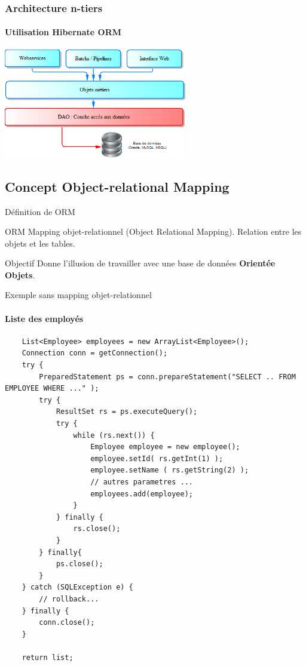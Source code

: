 \documentclass[compact]{beamer}%
\begin{document}
	\begin{frame}
	\frametitle{Architecture n-tiers}
	\framesubtitle{Utilisation Hibernate ORM}
	
	\begin{center}	
	\includegraphics[width=8cm]{images/arch_n_tiers_hibernate.png}
	\end{center}
\end{frame}
	
	
\subsection{Concept Object-relational Mapping}	
		
\begin{frame}{Définition de ORM}
	
	\begin{block}{ORM}
	Mapping objet-relationnel (Object Relational Mapping). Relation entre les objets et les tables.
	\end{block}

	\pause
	\begin{block}{Objectif}	
	Donne l'illusion de travailler avec une base de données \textbf{Orientée Objets}.
	\end{block}
	
\end{frame}
		
\begin{frame}[containsverbatim]{Exemple sans mapping objet-relationnel}
	\framesubtitle{Liste des employés}
	\begin{lstlisting}
	List<Employee> employees = new ArrayList<Employee>();
	Connection conn = getConnection();
	try {
		PreparedStatement ps = conn.prepareStatement("SELECT .. FROM EMPLOYEE WHERE ..." );
		try {
			ResultSet rs = ps.executeQuery();
			try {
				while (rs.next()) {
					Employee employee = new employee();
					employee.setId( rs.getInt(1) );
					employee.setName ( rs.getString(2) );
					// autres parametres ...
					employees.add(employee);
				}
			} finally {
				rs.close();
			}
		} finally{ 
			ps.close(); 
		}
	} catch (SQLException e) { 
		// rollback...
	} finally { 
		conn.close(); 
	}
	
	return list;
	\end{lstlisting}	
	
\end{frame}
	
\end{document}
